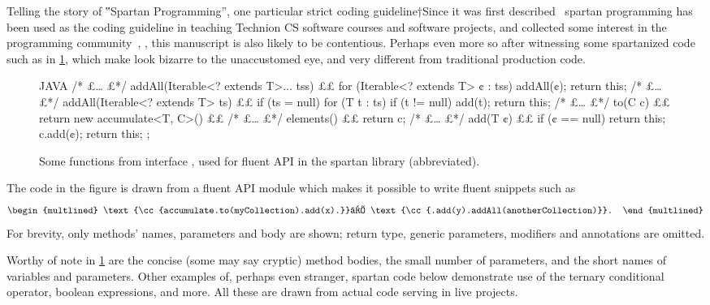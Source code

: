 Telling the story of ‟Spartan Programming”, one particular strict coding
guideline†{Since it was first described~\cite{Ege:Singh:Meyer:1998}
  spartan programming has been used as the coding guideline in teaching
  Technion CS software courses and software projects, and collected some interest
  in the programming community~\cite{Coding:Horror:Spartan}}, \Java, this
  manuscript is also likely to be contentious. Perhaps even more so after
witnessing some spartanized code such as in \cref{figure:accumulate}, which
make look bizarre to the unaccustomed eye, and very different from
traditional production \Java code.

\begin{figure}
\caption{\label{figure:accumulate}
  Some functions from interface ,
  used for fluent API in the spartan library (abbreviated).
  }
    \centering
\begin{code}[minipage,width=\columnwidth]{JAVA}
/* £… £*/ addAll(Iterable<? extends T>... tss) {££
  for (Iterable<? extends T> ¢ : tss)
    addAll(¢);
  return this;
}
/* £… £*/ addAll(Iterable<? extends T> ts) {££
  if (ts = null)
    for (T t : ts)
      if (t != null)
        add(t);
  return this;
}
/* £… £*/ to(C c) {££
  return new accumulate<T, C>() {££
    /* £… £*/ elements() {££
        return c;
    }
    /* £… £*/ add(T ¢) {££
        if (¢ == null)
          return this;
        c.add(¢);
        return this;
    }
  };
}
\end{code}
\end{figure}

The code in the figure is drawn from a fluent API module which makes it possible to write fluent snippets
such as \[
  \begin{multlined}
    \text{\cc{accumulate.to(myCollection).add(x).}}⏎
    \text{\cc{.add(y).addAll(anotherCollection)}}.
  \end{multlined}
\]
For brevity, only methods' names, parameters and body are shown;
return type, generic parameters, modifiers and annotations are omitted.

Worthy of note in \cref{figure:accumulate} are the concise (some may say
cryptic) method bodies, the small number of parameters, and the short names of
variables and parameters. Other examples of, perhaps even stranger, spartan
code below demonstrate use of the ternary conditional operator, boolean
expressions, and more. All these are drawn from actual code serving in live
projects.


